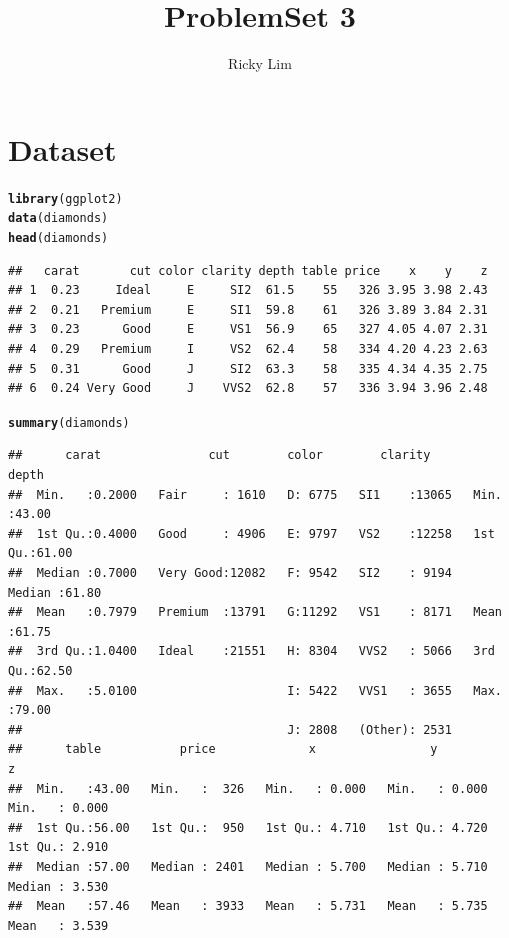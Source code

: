 \documentclass{article}\usepackage[]{graphicx}\usepackage[]{color}
\makeatletter
\newcommand{\hlstd}[1]{\textcolor[rgb]{0.345,0.345,0.345}{#1}}%
\newcommand{\hlkwd}[1]{\textcolor[rgb]{0.737,0.353,0.396}{\textbf{#1}}}%
\newenvironment{kframe}{%
 \def\at@end@of@kframe{}%
 \ifinner\ifhmode%
  \def\at@end@of@kframe{\end{minipage}}%
  \begin{minipage}{\columnwidth}%
 \fi\fi%
 \def\FrameCommand##1{\hskip\@totalleftmargin \hskip-\fboxsep
 \colorbox{shadecolor}{##1}\hskip-\fboxsep
     \hskip-\linewidth \hskip-\@totalleftmargin \hskip\columnwidth}%
 \MakeFramed {\advance\hsize-\width
   \@totalleftmargin\z@ \linewidth\hsize
   \@setminipage}}%
 {\par\unskip\endMakeFramed%
 \at@end@of@kframe}
\newenvironment{knitrout}{}{} %
\makeatother
\begin{document}
\author{Ricky Lim}
\title{ProblemSet 3}
\maketitle

\section{Dataset}
\begin{knitrout}
\color{fgcolor}\begin{kframe}
\begin{alltt}
\hlkwd{library}\hlstd{(ggplot2)}
\hlkwd{data}\hlstd{(diamonds)}
\hlkwd{head}\hlstd{(diamonds)}
\end{alltt}
\begin{verbatim}
##   carat       cut color clarity depth table price    x    y    z
## 1  0.23     Ideal     E     SI2  61.5    55   326 3.95 3.98 2.43
## 2  0.21   Premium     E     SI1  59.8    61   326 3.89 3.84 2.31
## 3  0.23      Good     E     VS1  56.9    65   327 4.05 4.07 2.31
## 4  0.29   Premium     I     VS2  62.4    58   334 4.20 4.23 2.63
## 5  0.31      Good     J     SI2  63.3    58   335 4.34 4.35 2.75
## 6  0.24 Very Good     J    VVS2  62.8    57   336 3.94 3.96 2.48
\end{verbatim}
\begin{alltt}
\hlkwd{summary}\hlstd{(diamonds)}
\end{alltt}
\begin{verbatim}
##      carat               cut        color        clarity          depth      
##  Min.   :0.2000   Fair     : 1610   D: 6775   SI1    :13065   Min.   :43.00  
##  1st Qu.:0.4000   Good     : 4906   E: 9797   VS2    :12258   1st Qu.:61.00  
##  Median :0.7000   Very Good:12082   F: 9542   SI2    : 9194   Median :61.80  
##  Mean   :0.7979   Premium  :13791   G:11292   VS1    : 8171   Mean   :61.75  
##  3rd Qu.:1.0400   Ideal    :21551   H: 8304   VVS2   : 5066   3rd Qu.:62.50  
##  Max.   :5.0100                     I: 5422   VVS1   : 3655   Max.   :79.00  
##                                     J: 2808   (Other): 2531                  
##      table           price             x                y                z         
##  Min.   :43.00   Min.   :  326   Min.   : 0.000   Min.   : 0.000   Min.   : 0.000  
##  1st Qu.:56.00   1st Qu.:  950   1st Qu.: 4.710   1st Qu.: 4.720   1st Qu.: 2.910  
##  Median :57.00   Median : 2401   Median : 5.700   Median : 5.710   Median : 3.530  
##  Mean   :57.46   Mean   : 3933   Mean   : 5.731   Mean   : 5.735   Mean   : 3.539  

\end{verbatim}
\end{kframe}
\end{knitrout}
\end{document}

